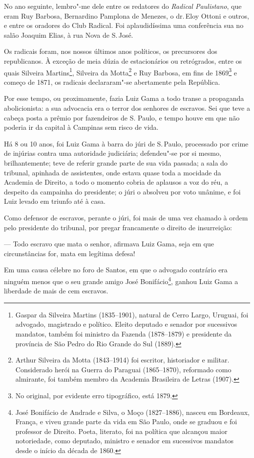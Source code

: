 No ano seguinte, lembro"-me dele entre os redatores do \emph{Radical
Paulistano}, que eram Ruy Barbosa, Bernardino Pamplona de Menezes, o dr.\,Eloy Ottoni e outros, e entre os oradores do Club Radical. Foi
aplaudidíssima uma conferência sua no salão Joaquim Elias, à rua Nova de
S.\,José.

Os radicais foram, nos nossos últimos anos políticos, os precursores dos
republicanos. À exceção de meia dúzia de estacionários ou retrógrados,
entre os quais Silveira Martins\footnote{Gaspar da Silveira Martins
  (1835--1901), natural de Cerro Largo, Uruguai, foi advogado, magistrado
  e político. Eleito deputado e senador por sucessivos mandatos, também
  foi ministro da Fazenda (1878--1879) e presidente da província de São
  Pedro do Rio Grande do Sul (1889).}, Silveira da Motta\footnote{
  Arthur Silveira da Motta (1843--1914) foi escritor, historiador e
  militar. Considerado herói na Guerra do Paraguai (1865--1870),
  reformado como almirante, foi também membro da Academia Brasileira de
  Letras (1907).} e Ruy Barbosa, em fins de 1869\footnote{No original,
  por evidente erro tipográfico, está 1879.} e começo de 1871, os
radicais declararam"-se abertamente pela República.

Por esse tempo, ou proximamente, fazia Luiz Gama a todo transe a
propaganda abolicionista: a sua advocacia era o terror dos senhores de
escravos. Sei que teve a cabeça posta a prêmio por fazendeiros de S.
Paulo, e tempo houve em que não poderia ir da capital à Campinas sem
risco de vida.

Há 8 ou 10 anos, foi Luiz Gama à barra do júri de S.\,Paulo, processado
por crime de injúrias contra uma autoridade judiciária; defendeu"-se por
si mesmo, brilhantemente; teve de referir grande parte de sua vida
passada; a sala do tribunal, apinhada de assistentes, onde estava quase
toda a mocidade da Academia de Direito, a todo o momento cobria de
aplausos a voz do réu, a despeito da campainha do presidente; o júri o
absolveu por voto unânime, e foi Luiz levado em triunfo até à casa.

Como defensor de escravos, perante o júri, foi mais de uma vez chamado à
ordem pelo presidente do tribunal, por pregar francamente o direito de
insurreição:

--- Todo escravo que mata o senhor, afirmava Luiz Gama, seja em que
circunstâncias for, mata em legítima defesa!

Em uma causa célebre no foro de Santos, em que o advogado contrário era
ninguém menos que o seu grande amigo José Bonifácio\footnote{José \label{bonifacio}
  Bonifácio de Andrade e Silva, o Moço (1827--1886), nasceu em Bordeaux,
  França, e viveu grande parte da vida em São Paulo, onde se graduou e
  foi professor de Direito. Poeta, literato, foi na política que
  alcançou maior notoriedade, como deputado, ministro e senador em
  sucessivos mandatos desde o início da década de 1860.}, ganhou Luiz
Gama a liberdade de mais de cem escravos.

